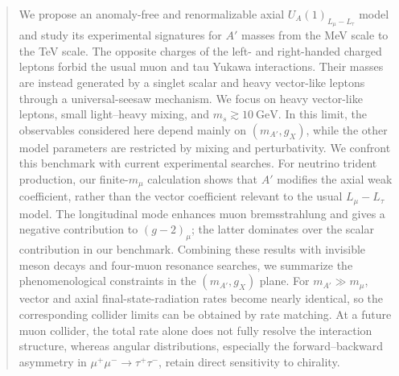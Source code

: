 \documentclass[onecolumn, aps, nofootinbib, prd, preprint, floats, floatfix, amsmath, amssymb, superscriptaddress, preprintnumbers]{revtex4-2}
\begin{document}
\begin{abstract}
We propose an anomaly-free and renormalizable axial $U_A(1)_{L_\mu-L_\tau}$ model and study its experimental signatures for $A'$ masses from the MeV scale to the TeV scale. The opposite charges of the left- and right-handed charged leptons forbid the usual muon and tau Yukawa interactions. Their masses are instead generated by a singlet scalar and heavy vector-like leptons through a universal-seesaw mechanism. We focus on heavy vector-like leptons, small light--heavy mixing, and $m_s\gtrsim10~\mathrm{GeV}$. In this limit, the observables considered here depend mainly on $(m_{A'},g_X)$, while the other model parameters are restricted by mixing and perturbativity. We confront this benchmark with current experimental searches. For neutrino trident production, our finite-$m_\mu$ calculation shows that $A'$ modifies the axial weak coefficient, rather than the vector coefficient relevant to the usual $L_\mu-L_\tau$ model. The longitudinal mode enhances muon bremsstrahlung and gives a negative contribution to $(g-2)_\mu$; the latter dominates over the scalar contribution in our benchmark. Combining these results with invisible meson decays and four-muon resonance searches, we summarize the phenomenological constraints in the $(m_{A'},g_X)$ plane. For $m_{A'}\gg m_\mu$, vector and axial final-state-radiation rates become nearly identical, so the corresponding collider limits can be obtained by rate matching. At a future muon collider, the total rate alone does not fully resolve the interaction structure, whereas angular distributions, especially the forward--backward asymmetry in $\mu^+\mu^-\to\tau^+\tau^-$, retain direct sensitivity to chirality.
\end{abstract}


\makeatletter
\@booleanfalse\titlepage@sw
\@booleanfalse\preprintsty@sw
\makeatother
\maketitle

\begingroup
\renewcommand{\thefootnote}{\fnsymbol{footnote}}



\end{document}
